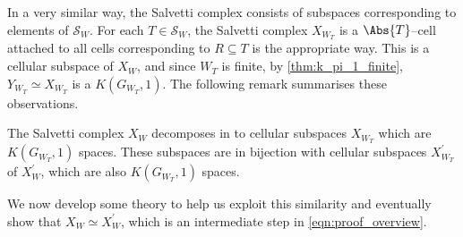 \documentclass[class=article, crop=false]{standalone}
\begin{document}
In a very similar way, the Salvetti complex consists of subspaces corresponding to elements of $\mathcal{S}_W$. For each $T \in \mathcal{S}_W$, the Salvetti complex $X_{W_T}$ is a $\Abs{T}$--cell attached to all cells corresponding to $R \subseteq T$ is the appropriate way. This is a cellular subspace of $X_W$, and since $W_T$ is finite, by \cref{thm:k_pi_1_finite}, $Y_{W_T} \simeq X_{W_T}$ is a $K(G_{W_T},1)$. The following remark summarises these observations.

\begin{remark}
    The Salvetti complex $X_W$ decomposes in to cellular subspaces $X_{W_T}$ which are $K(G_{W_T},1)$ spaces. These subspaces are in bijection with cellular subspaces $X^\prime_{W_T}$ of $X^\prime_W$, which are also $K(G_{W_T},1)$ spaces.
    \label{rmk:salvetti_X_prime_similarities}
\end{remark}

We now develop some theory to help us exploit this similarity and eventually show that $X_W \simeq X^\prime_{W}$, which is an intermediate step in \eqref{eqn:proof_overview}.
\end{document}
